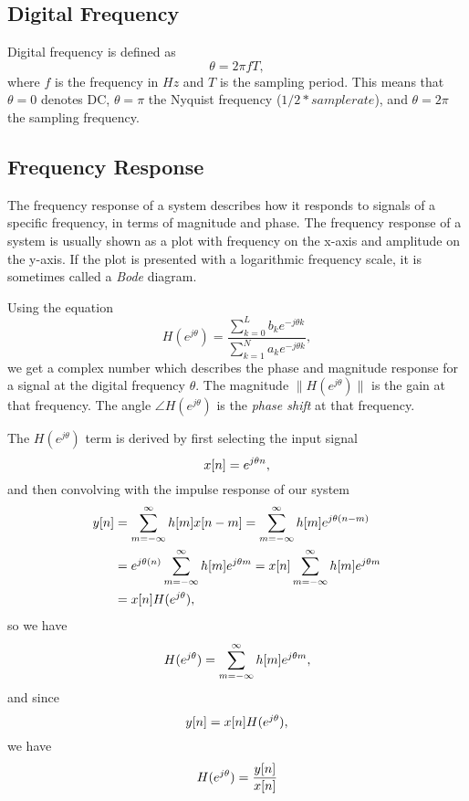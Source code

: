 \documentclass[11pt]{article}
\let\originalleft\left
\let\originalright\right
\renewcommand{\left}{\mathopen{}\mathclose\bgroup\originalleft}
\renewcommand{\right}{\aftergroup\egroup\originalright}
\def\lsqb{\left[}
\def\rsqb{\right]}
\def\sqb#1{\lsqb #1 \rsqb}
\def\xsig{x\sqb{n}}
\def\ysig{y\sqb{n}}
\begin{document}
\subsection{Digital Frequency}
Digital frequency is defined as
\begin{equation}
    \theta = 2\pi f T,
\end{equation}
where $f$ is the frequency in $Hz$ and $T$ is the sampling period. This means that $\theta=0$ denotes DC, $\theta=\pi$ the Nyquist frequency ($1/2 * samplerate$), and $\theta=2\pi$ the sampling frequency.

\subsection{Frequency Response}
The frequency response of a system describes how it responds to signals of a specific frequency, in terms of magnitude and phase. The frequency response of a system is usually shown as a plot with frequency on the x-axis and amplitude on the y-axis. If the plot is presented with a logarithmic frequency scale, it is sometimes called a \textit{Bode} diagram.

Using the equation
\def\hfun{H(e^{j\theta})}
\begin{equation}
    \hfun = \frac{\sum_{k=0}^{L} b_k e^{-j\theta k}}{\sum_{k=1}^{N} a_k e^{-j\theta k}},
\end{equation}
we get a complex number which describes the phase and magnitude response for a signal at the digital frequency $\theta$. The magnitude $\|\hfun\|$ is the gain at that frequency. The angle $\angle \hfun$ is the \textit{phase shift} at that frequency.

The $\hfun$ term is derived by first selecting the input signal
\begin{equation}
    \xsig = e^{j\theta n},
\end{equation}
and then convolving with the impulse response of our system
\def\convsum{\sum_{m=-\infty}^{\infty}}
\begin{align}
    \ysig &= \convsum h\sqb{m} x\sqb{n-m} = \convsum h\sqb{m} e^{j\theta(n-m)} \\
          &= e^{j\theta(n)} \convsum h\sqb{m} e^{j\theta m} = \xsig \convsum h\sqb{m} e^{j\theta m} \\
          &= \xsig \hfun,
\end{align}
so we have
\begin{equation}
    \hfun = \convsum h\sqb{m} e^{j\theta m},
\end{equation}
and since
\begin{equation}
    \ysig = \xsig \hfun,
\end{equation}
we have
\begin{equation}
    \hfun = \frac{\ysig}{\xsig}
\end{equation}
\end{document}
